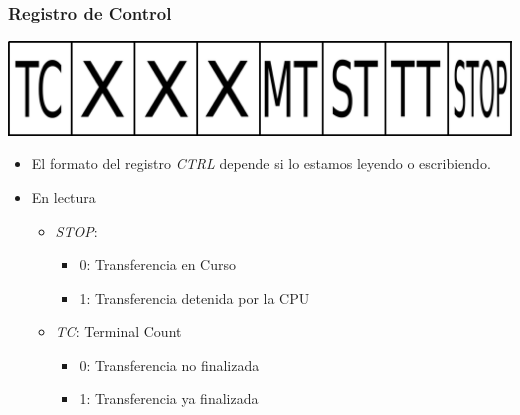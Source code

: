 \documentclass{beamer}
\begin{document}
\begin{frame}
\frametitle{Registro de Control}
  \begin{center}
      \includegraphics[scale=0.45]{cdma-ctrl.png}
  \end{center}

  \begin{itemize}
   \item El formato del registro \emph{CTRL} depende si lo estamos leyendo o escribiendo.
  \end{itemize}
  \begin{itemize}
     \item En lectura
     \begin{itemize}
        \item \emph{STOP}:
	  \begin{itemize}
	      \item 0: Transferencia en Curso
	      \item 1: Transferencia detenida por la CPU
	  \end{itemize}
        \item \emph{TC}: Terminal Count
	  \begin{itemize}
	      \item 0: Transferencia no finalizada
	      \item 1: Transferencia ya finalizada
	  \end{itemize}
     \end{itemize}
  \end{itemize}
\end{frame}
\end{document}
